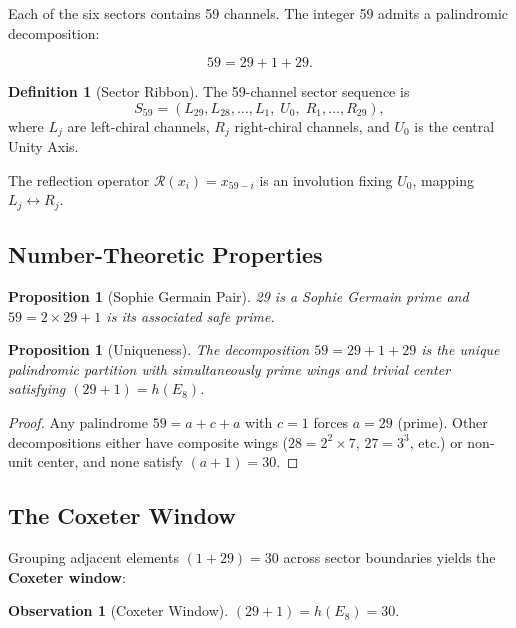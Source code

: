 \documentclass[11pt, a4paper]{article}
\theoremstyle{plain}
\newtheorem{proposition}[theorem]{Proposition}
\theoremstyle{definition}
\newtheorem{definition}[theorem]{Definition}
\newtheorem{observation}{Observation}[section]
\theoremstyle{remark}
\begin{document}
Each of the six sectors contains 59 channels. The integer 59
admits a palindromic decomposition:

\begin{equation}
59 = 29 + 1 + 29.
\end{equation}

\begin{definition}[Sector Ribbon]
The 59-channel sector sequence is
\[
S_{59} = (L_{29}, L_{28}, \ldots, L_1,\; U_0,\; R_1, \ldots, R_{29}),
\]
where $L_j$ are left-chiral channels, $R_j$ right-chiral channels,
and $U_0$ is the central Unity Axis.
\end{definition}

The reflection operator $\mathcal{R}(x_i) = x_{59-i}$ is an
involution fixing $U_0$, mapping $L_j \leftrightarrow R_j$.

\subsection{Number-Theoretic Properties}

\begin{proposition}[Sophie Germain Pair]
29 is a Sophie Germain prime and $59 = 2 \times 29 + 1$ is its
associated safe prime.
\end{proposition}

\begin{proposition}[Uniqueness]
\label{prop:unique}
The decomposition $59 = 29 + 1 + 29$ is the unique palindromic
partition with simultaneously prime wings and trivial center
satisfying $(29 + 1) = h(E_8)$.
\end{proposition}

\begin{proof}
Any palindrome $59 = a + c + a$ with $c = 1$ forces $a = 29$
(prime). Other decompositions either have composite wings
($28 = 2^2 \times 7$, $27 = 3^3$, etc.) or non-unit center,
and none satisfy $(a + 1) = 30$.
\end{proof}

\subsection{The Coxeter Window}

Grouping adjacent elements $(1 + 29) = 30$ across sector boundaries
yields the \textbf{Coxeter window}:

\begin{observation}[Coxeter Window]
\label{obs:window}
$(29 + 1) = h(E_8) = 30$.
\end{observation}
\end{document}
